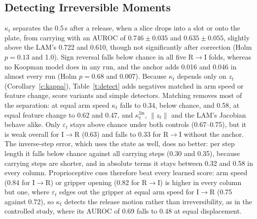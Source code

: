\documentclass{jcse}
\newcommand{\klin}{\kappa^{\mathrm{lin}}}
\begin{document}
\subsection{Detecting Irreversible Moments}
$\kappa_t$ separates the 0.5\,s after a release, when a slice drops into a slot or onto the plate, from carrying with an AUROC of $0.746\pm0.035$ and $0.635\pm0.055$, slightly above the LAM's 0.722 and 0.610, though not significantly after correction (Holm $p=0.13$ and 1.0).
Sign reversal falls below chance in all five R$\to$I folds, whereas no Koopman model does in any run, and the anchor adds 0.016 and 0.046 in almost every run (Holm $p=0.68$ and $0.007$).
Because $\kappa_t$ depends only on $z_t$ (Corollary~\ref{c:kappa}), Table~\ref{t:detect} adds negatives matched in arm speed or feature change, score variants and simple detectors.
Matching removes most of the separation: at equal arm speed $\kappa_t$ falls to 0.34, below chance, and 0.58, at equal feature change to 0.62 and 0.47, and $\klin_t$, $\|z_t\|$ and the LAM's Jacobian behave alike.
Only $\varepsilon_t$ stays above chance under both controls (0.67--0.75), but it is weak overall for I$\to$R (0.63) and falls to 0.33 for R$\to$I without the anchor.
The inverse-step error, which uses the state as well, does no better: per step length it falls below chance against all carrying steps (0.30 and 0.35), because carrying steps are shorter, and in absolute terms it stays between 0.32 and 0.58 in every column.
Proprioceptive cues therefore beat every learned score: arm speed (0.84 for I$\to$R) or gripper opening (0.82 for R$\to$I) is higher in every column but one, where $\varepsilon_t$ edges out the gripper at equal arm speed for I$\to$R (0.75 against 0.72), so $\kappa_t$ detects the release motion rather than irreversibility, as in the controlled study, where its AUROC of 0.69 falls to 0.48 at equal displacement.
\end{document}
